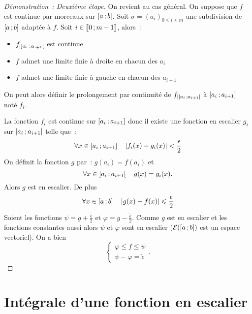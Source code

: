 \begin{proof}[Démonstration~: Deuxième étape]
  On revient au cas général. On suppose que \(f\) est continue par morceaux sur
  \(\left[ a \, ; {} b \right]\). Soit \(\sigma=(a_i)_{0 \leqslant i \leqslant m}\) une
  subdivision de \(\left[ a \, ; {} b \right]\) adaptée à \(f\). Soit \(i \in
  \mathopen{\llbracket}0\mathclose{}\mathpunct{};m-1\mathclose{\rrbracket}\), alors~:
  \begin{itemize}
    \item \(f_{|\left] \alpha_i \, ; {} \alpha_{i+1} \right[}\) est continue
    \item \(f\) admet une limite finie à droite en chacun des \(a_i\)
    \item \(f\) admet une limite finie à gauche en chacun des \(a_{i+1}\)
  \end{itemize}
  On peut alors définir le prolongement par continuité de
  \(f_{|\left] a_i \, ; {} a_{i+1} \right[}\) à \(\left[ a_i \, ; {} a_{i+1} \right]\) noté
  \(f_i\).

  La fonction \(f_i\) est continue sur \(\left[ a_i \, ; {} a_{i+1} \right]\) donc il
  existe une fonction en escalier \(g_i\) sur \(\left[ a_i \, ; {} a_{i+1} \right]\)
  telle que~:
  \begin{equation}
    \forall x \in \left[ a_i \, ; {} a_{i+1} \right] \quad \left\lvert f_i(x)-g_i(x)\right\rvert <
    \frac{\epsilon}{2}
  \end{equation}
  On définit la fonction \(g\) par~: \(g(a_i)=f(a_i)\) et
  \begin{equation}
    \forall x \in \left] a_i \, ; {} a_{i+1} \right[ \quad g(x)=g_i(x).
  \end{equation}
  Alors \(g\) est en escalier. De plus
  \begin{equation}
    \forall x \in \left[ a \, ; {} b \right] \quad \left\lvert g(x)-f(x)\right\rvert \leqslant
    \frac{\epsilon}{2}
  \end{equation}
  Soient les fonctions \(\psi=g + \frac{\tilde{\epsilon}}{2}\) et \(\varphi=g -
  \frac{\tilde{\epsilon}}{2}\). Comme \(g\) est en escalier et les fonctions
  constantes aussi alors \(\psi\) et \(\varphi\) sont en escalier
  (\(\mathcal{E}(\left[ a \, ; {} b \right])\) est un espace vectoriel). On a bien
  \begin{equation}
    \begin{cases}
      \varphi \leqslant f \leqslant \psi \\
      \psi-\varphi=\tilde{\epsilon}
    \end{cases}.
  \end{equation}
\end{proof}

\section{Intégrale d'une fonction en escalier}

